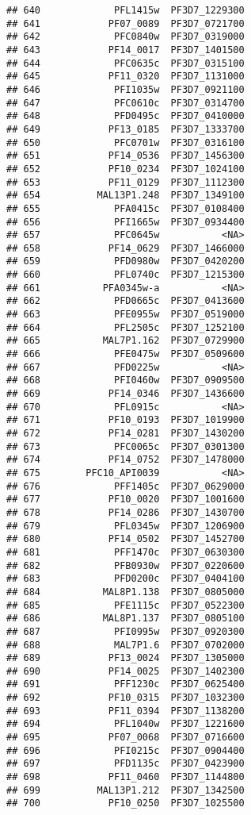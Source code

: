 \documentclass[12pt, a4paper]{article}\usepackage[]{graphicx}\usepackage[]{color}
\makeatletter
\newenvironment{kframe}{%
 \def\at@end@of@kframe{}%
 \ifinner\ifhmode%
  \def\at@end@of@kframe{\end{minipage}}%
  \begin{minipage}{\columnwidth}%
 \fi\fi%
 \def\FrameCommand##1{\hskip\@totalleftmargin \hskip-\fboxsep
 \colorbox{shadecolor}{##1}\hskip-\fboxsep
     \hskip-\linewidth \hskip-\@totalleftmargin \hskip\columnwidth}%
 \MakeFramed {\advance\hsize-\width
   \@totalleftmargin\z@ \linewidth\hsize
   \@setminipage}}%
 {\par\unskip\endMakeFramed%
 \at@end@of@kframe}
\newenvironment{knitrout}{}{} %
\makeatother
\begin{document}
\begin{knitrout}
\begin{kframe}
\begin{verbatim}
## 640             PFL1415w  PF3D7_1229300
## 641            PF07_0089  PF3D7_0721700
## 642             PFC0840w  PF3D7_0319000
## 643            PF14_0017  PF3D7_1401500
## 644             PFC0635c  PF3D7_0315100
## 645            PF11_0320  PF3D7_1131000
## 646             PFI1035w  PF3D7_0921100
## 647             PFC0610c  PF3D7_0314700
## 648             PFD0495c  PF3D7_0410000
## 649            PF13_0185  PF3D7_1333700
## 650             PFC0701w  PF3D7_0316100
## 651            PF14_0536  PF3D7_1456300
## 652            PF10_0234  PF3D7_1024100
## 653            PF11_0129  PF3D7_1112300
## 654          MAL13P1.248  PF3D7_1349100
## 655             PFA0415c  PF3D7_0108400
## 656             PFI1665w  PF3D7_0934400
## 657             PFC0645w           <NA>
## 658            PF14_0629  PF3D7_1466000
## 659             PFD0980w  PF3D7_0420200
## 660             PFL0740c  PF3D7_1215300
## 661           PFA0345w-a           <NA>
## 662             PFD0665c  PF3D7_0413600
## 663             PFE0955w  PF3D7_0519000
## 664             PFL2505c  PF3D7_1252100
## 665           MAL7P1.162  PF3D7_0729900
## 666             PFE0475w  PF3D7_0509600
## 667             PFD0225w           <NA>
## 668             PFI0460w  PF3D7_0909500
## 669            PF14_0346  PF3D7_1436600
## 670             PFL0915c           <NA>
## 671            PF10_0193  PF3D7_1019900
## 672            PF14_0281  PF3D7_1430200
## 673             PFC0065c  PF3D7_0301300
## 674            PF14_0752  PF3D7_1478000
## 675        PFC10_API0039           <NA>
## 676             PFF1405c  PF3D7_0629000
## 677            PF10_0020  PF3D7_1001600
## 678            PF14_0286  PF3D7_1430700
## 679             PFL0345w  PF3D7_1206900
## 680            PF14_0502  PF3D7_1452700
## 681             PFF1470c  PF3D7_0630300
## 682             PFB0930w  PF3D7_0220600
## 683             PFD0200c  PF3D7_0404100
## 684           MAL8P1.138  PF3D7_0805000
## 685             PFE1115c  PF3D7_0522300
## 686           MAL8P1.137  PF3D7_0805100
## 687             PFI0995w  PF3D7_0920300
## 688             MAL7P1.6  PF3D7_0702000
## 689            PF13_0024  PF3D7_1305000
## 690            PF14_0025  PF3D7_1402300
## 691             PFF1230c  PF3D7_0625400
## 692            PF10_0315  PF3D7_1032300
## 693            PF11_0394  PF3D7_1138200
## 694             PFL1040w  PF3D7_1221600
## 695            PF07_0068  PF3D7_0716600
## 696             PFI0215c  PF3D7_0904400
## 697             PFD1135c  PF3D7_0423900
## 698            PF11_0460  PF3D7_1144800
## 699          MAL13P1.212  PF3D7_1342500
## 700            PF10_0250  PF3D7_1025500

\end{verbatim}
\end{kframe}
\end{knitrout}
\end{document}
